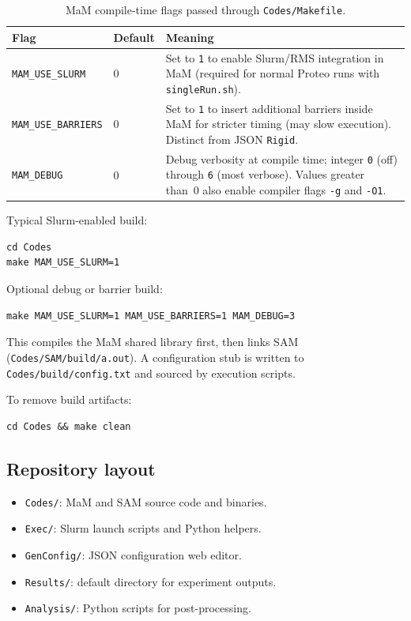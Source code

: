 \begin{table}[H]
\centering
\small
\begin{tabular}{@{}llp{6.5cm}@{}}
\toprule
\textbf{Flag} & \textbf{Default} & \textbf{Meaning} \\
\midrule
\texttt{MAM\_USE\_SLURM} & 0 & Set to \texttt{1} to enable Slurm/RMS integration in MaM (required for normal Proteo runs with \texttt{singleRun.sh}). \\
\texttt{MAM\_USE\_BARRIERS} & 0 & Set to \texttt{1} to insert additional barriers inside MaM for stricter timing (may slow execution). Distinct from JSON \texttt{Rigid}. \\
\texttt{MAM\_DEBUG} & 0 & Debug verbosity at compile time; integer \texttt{0} (off) through \texttt{6} (most verbose). Values greater than~0 also enable compiler flags \texttt{-g} and \texttt{-O1}. \\
\bottomrule
\end{tabular}
\caption{MaM compile-time flags passed through \texttt{Codes/Makefile}.}
\end{table}

Typical Slurm-enabled build:

\begin{lstlisting}[style=bashstyle,caption={Build MaM and SAM with Slurm support.},captionpos=b]
cd Codes
make MAM_USE_SLURM=1
\end{lstlisting}

Optional debug or barrier build:

\begin{lstlisting}[style=bashstyle]
make MAM_USE_SLURM=1 MAM_USE_BARRIERS=1 MAM_DEBUG=3
\end{lstlisting}

This compiles the MaM shared library first, then links SAM (\texttt{Codes/SAM/build/a.out}). A configuration stub is written to \texttt{Codes/build/config.txt} and sourced by execution scripts.

To remove build artifacts:

\begin{lstlisting}[style=bashstyle]
cd Codes && make clean
\end{lstlisting}

\subsection{Repository layout}

\begin{itemize}
  \item \texttt{Codes/}: MaM and SAM source code and binaries.
  \item \texttt{Exec/}: Slurm launch scripts and Python helpers.
  \item \texttt{GenConfig/}: JSON configuration web editor.
  \item \texttt{Results/}: default directory for experiment outputs.
  \item \texttt{Analysis/}: Python scripts for post-processing.
\end{itemize}


